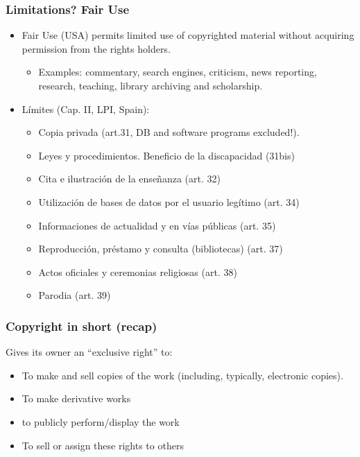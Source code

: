 \documentclass{beamer}
\begin{document}

\begin{frame}
\frametitle{Limitations? Fair Use}


\begin{itemize}
\item \alert{Fair Use} (USA) permits limited use of copyrighted material without acquiring permission from the rights holders.
	\begin{itemize}		
	\item Examples: commentary, search engines, criticism, news reporting, research, teaching, library archiving and scholarship.
	\end{itemize}
\item \alert{Límites} (Cap. II, LPI, Spain): 
	\begin{itemize}
	\item Copia privada (art.31, DB and software programs excluded!). 
	\item Leyes y procedimientos. Beneficio de la discapacidad (31bis) 
	\item Cita e ilustración de la enseñanza (art. 32)
	\item Utilización de bases de datos por el usuario legítimo (art. 34)
	\item Informaciones de actualidad y en vías públicas (art. 35)
	\item Reproducción, préstamo y consulta (bibliotecas) (art. 37)
	\item Actos oficiales y ceremonias religiosas (art. 38)
	\item Parodia (art. 39)
	\end{itemize}
\end{itemize}

\end{frame}



\begin{frame}
\frametitle{Copyright in short (recap)}

Gives its owner an ``exclusive right'' to:

\begin{itemize}
\item To make and sell copies of the work (including,
typically, electronic copies).
\item To make derivative works
\item to publicly perform/display the work
\item To sell or assign these rights to others
\end{itemize}

\end{frame}
\end{document}
